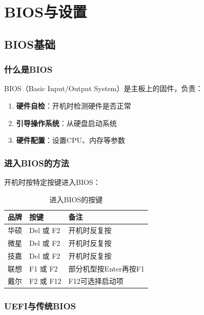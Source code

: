 \documentclass[12pt,UTF8]{ctexbook}
\begin{document}
\part{BIOS与设置}

\chapter{BIOS基础}

\section{什么是BIOS}

BIOS（Basic Input/Output System）是主板上的固件，负责：

\begin{enumerate}
    \item \textbf{硬件自检}：开机时检测硬件是否正常
    \item \textbf{引导操作系统}：从硬盘启动系统
    \item \textbf{硬件配置}：设置CPU、内存等参数
\end{enumerate}

\section{进入BIOS的方法}

开机时按特定按键进入BIOS：

\begin{table}[H]
    \centering
    \begin{tabular}{|p{3cm}|p{3cm}|p{6cm}|}
        \hline
        \textbf{品牌} & \textbf{按键} & \textbf{备注} \\
        \hline
        华硕 & Del 或 F2 & 开机时反复按 \\
        \hline
        微星 & Del 或 F2 & 开机时反复按 \\
        \hline
        技嘉 & Del 或 F2 & 开机时反复按 \\
        \hline
        联想 & F1 或 F2 & 部分机型按Enter再按F1 \\
        \hline
        戴尔 & F2 或 F12 & F12可选择启动项 \\
        \hline
    \end{tabular}
    \caption{进入BIOS的按键}
    \label{tab:bios_keys}
\end{table}

\section{UEFI与传统BIOS}
\end{document}
